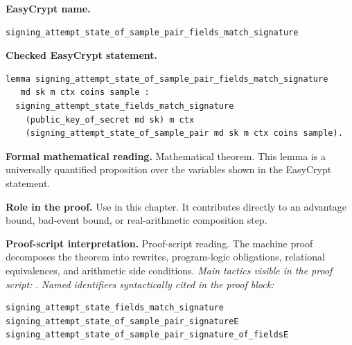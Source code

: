 \begin{formaltheorem}
\noindent\textbf{EasyCrypt name.}
\begin{lstlisting}[language=EasyCrypt,basicstyle=\ttfamily\scriptsize]
signing_attempt_state_of_sample_pair_fields_match_signature
\end{lstlisting}
\noindent\textbf{Checked EasyCrypt statement.}
\begin{lstlisting}[language=EasyCrypt,basicstyle=\ttfamily\scriptsize]
lemma signing_attempt_state_of_sample_pair_fields_match_signature
   md sk m ctx coins sample :
  signing_attempt_state_fields_match_signature
    (public_key_of_secret md sk) m ctx
    (signing_attempt_state_of_sample_pair md sk m ctx coins sample).
\end{lstlisting}
\noindent\textbf{Formal mathematical reading.}
Mathematical theorem. This lemma is a universally quantified proposition over the variables shown in the EasyCrypt statement.

\noindent\textbf{Role in the proof.}
Use in this chapter. It contributes directly to an advantage bound, bad-event bound, or real-arithmetic composition step.

\noindent\textbf{Proof-script interpretation.}
Proof-script reading. The machine proof decomposes the theorem into rewrites, program-logic obligations, relational equivalences, and arithmetic side conditions.
\emph{Main tactics visible in the proof script:} .
\emph{Named identifiers syntactically cited in the proof block:}
\begin{lstlisting}[language=EasyCrypt,basicstyle=\ttfamily\scriptsize]
signing_attempt_state_fields_match_signature
signing_attempt_state_of_sample_pair_signatureE
signing_attempt_state_of_sample_pair_signature_of_fieldsE
\end{lstlisting}

\end{formaltheorem}

